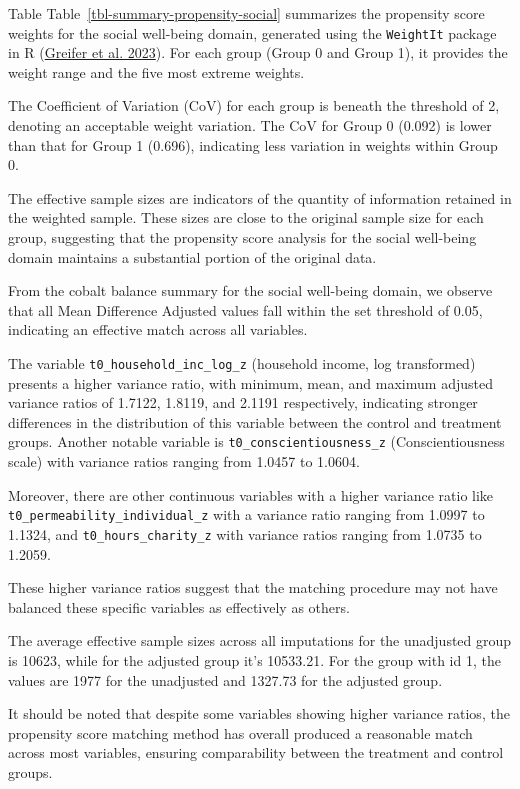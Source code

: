 \documentclass[
  singlecolumn]{report}
\begin{document}
Table Table~\ref{tbl-summary-propensity-social} summarizes the
propensity score weights for the social well-being domain, generated
using the \texttt{WeightIt} package in R
(\protect\hyperlink{ref-greifer2023}{Greifer et al. 2023}). For each
group (Group 0 and Group 1), it provides the weight range and the five
most extreme weights.

The Coefficient of Variation (CoV) for each group is beneath the
threshold of 2, denoting an acceptable weight variation. The CoV for
Group 0 (0.092) is lower than that for Group 1 (0.696), indicating less
variation in weights within Group 0.

The effective sample sizes are indicators of the quantity of information
retained in the weighted sample. These sizes are close to the original
sample size for each group, suggesting that the propensity score
analysis for the social well-being domain maintains a substantial
portion of the original data.

From the cobalt balance summary for the social well-being domain, we
observe that all Mean Difference Adjusted values fall within the set
threshold of 0.05, indicating an effective match across all variables.

The variable \texttt{t0\_household\_inc\_log\_z} (household income, log
transformed) presents a higher variance ratio, with minimum, mean, and
maximum adjusted variance ratios of 1.7122, 1.8119, and 2.1191
respectively, indicating stronger differences in the distribution of
this variable between the control and treatment groups. Another notable
variable is \texttt{t0\_conscientiousness\_z} (Conscientiousness scale)
with variance ratios ranging from 1.0457 to 1.0604.

Moreover, there are other continuous variables with a higher variance
ratio like \texttt{t0\_permeability\_individual\_z} with a variance
ratio ranging from 1.0997 to 1.1324, and \texttt{t0\_hours\_charity\_z}
with variance ratios ranging from 1.0735 to 1.2059.

These higher variance ratios suggest that the matching procedure may not
have balanced these specific variables as effectively as others.

The average effective sample sizes across all imputations for the
unadjusted group is 10623, while for the adjusted group it's 10533.21.
For the group with id 1, the values are 1977 for the unadjusted and
1327.73 for the adjusted group.

It should be noted that despite some variables showing higher variance
ratios, the propensity score matching method has overall produced a
reasonable match across most variables, ensuring comparability between
the treatment and control groups.
\end{document}
